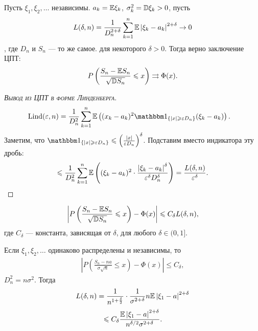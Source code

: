 \documentclass[../main.tex]{subfiles}
\begin{document}
\begin{thm}
 Пусть $ \xi_1, \xi_2, \ldots $ независимы. $ a_k = \mathbb E \xi_k $, $ \sigma_k^{2} = \mathbb D \xi_k > 0 $, пусть
 \begin{align*}
  L(\delta, n) = \frac{1}{D_n^{2+\delta}} \sum_{k=1}^{n} \mathbb E \left| \xi_k - a_k \right|^{2 + \delta} \to 0
 \end{align*}, где $ D_n $ и $ S_n $ --- то же самое. для некоторого $ \delta  > 0 $. Тогда верно заключение ЦПТ:
 \begin{align*}
  P \left( \frac{S_n - \mathbb E S_n}{\sqrt{\mathbb D S_n}} \leqslant x \right) \rightrightarrows \Phi(x).
 \end{align*}
\end{thm}
\begin{proof}[\normalfont\textsc{Вывод из ЦПТ в форме Линденберга}]
 \begin{align*}
  \mathrm{Lind}(\eps, n) &= \frac{1}{D_n^{2}} \sum_{k=1}^{n} \E \left( (x_k-a_k)^{2}\Ind_{\left\{ \left| x \right| \geqslant \eps D_n\right\}}(\xi_k - a_k) \right).
 \end{align*} Заметим, что $ \Ind_{\left\{ \left| x \right| \geqslant \eps D_n \right\}} \leqslant \left(\frac{\left| x \right|}{\eps D_n} \right)^{\delta} $. Подставим вместо индикатора эту дробь:
 \begin{align*}
  \leqslant \frac{1}{D_n^{2}} \sum_{k=1}^{n} \mathbb E \left( (\xi_k-a_k)^{2} \cdot \frac{\left| \xi_k-a_k \right|^{\delta}}{\varepsilon^{\delta} D_n^{\delta}} \right) = \frac{L(\delta, n)}{\varepsilon^{\delta}}.
 \end{align*} 
\end{proof}
\begin{thm}
 \begin{align*}
  \left| P \left( \frac{S_n-\mathbb E S_n}{\sqrt{\mathbb D S_n}} \leqslant x\right) - \Phi(x) \right| \leqslant C_\delta L(\delta, n),
 \end{align*} где $ C_\delta $ --- константа, зависящая от $ \delta $, для любого $ \delta \in (0, 1] $.
\end{thm}
\begin{crly}
 Если $ \xi_1, \xi_2, \ldots $  одинаково распределены и независимы, то
 \begin{align*}
  \left| P \left( \frac{S_n - na}{\sigma \sqrt n} \leqslant x \right) - \Phi(x) \right| \leqslant C_\delta,
 \end{align*} $ D_n^{2} = n\sigma^{2} $. Тогда
 \begin{align*}
  L(\delta, n) = \frac{1}{n^{1 + \frac{\delta}{2}}} \cdot \frac{1}{\sigma^{2 + \delta}} n \mathbb E \left| \xi_1 - a \right|^{2 + \delta}
 \end{align*}
 \begin{align*}
  \leqslant C_\delta \frac{\mathbb E \left| \xi_1 - a \right|^{2+\delta}}{n^{\delta / 2} \sigma^{2 + \delta}}.
 \end{align*}
\end{crly}
\end{document}
